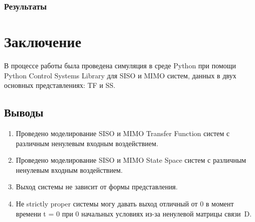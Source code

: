 \documentclass[16pt]{article}
\begin{document}
\subsubsection{Результаты}


\newpage
\section{Заключение}
В процессе работы была проведена симуляция в среде Python при помощи Python Control Systems Library для SISO и MIMO систем, данных в двух основных представлениях: TF и SS.
\subsection{Выводы}
\begin{enumerate}
   \item Проведено моделирование SISO и MIMO Transfer Function систем с различным ненулевым входным воздействием.
   \item Проведено моделирование SISO и MIMO State Space систем с различным ненулевым входным воздействием.
   \item Выход системы не зависит от формы представления.
   \item Не strictly proper системы могу давать выход отличный от 0 в момент времени t = 0 при 0 начальных условиях из-за ненулевой матрицы связи~D. 
\end{enumerate}
\end{document}
